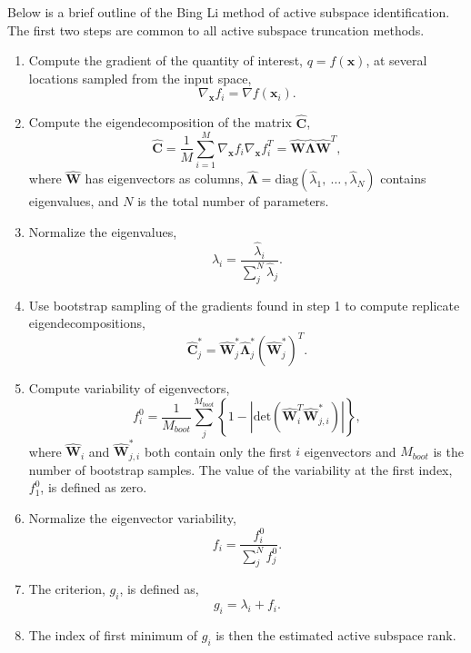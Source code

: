 Below is a brief outline of the Bing Li method of active subspace 
identification. The first two steps are common to all active subspace 
truncation methods.
\begin{enumerate}
\item Compute the gradient of the quantity of interest, $q = f(\mathbf{x})$,
    at several locations sampled from the input space,
    $$\nabla_{\mathbf{x}} f_i = \nabla f(\mathbf{x}_i).$$

\item Compute the eigendecomposition of the matrix $\hat{\mathbf{C}}$,
    $$\hat{\mathbf{C}} = \frac{1}{M}\sum_{i=1}^{M}\nabla_{\mathbf{x}} f_i\nabla_{\mathbf{x}} f_i^T = \hat{\mathbf{W}}\hat{\mathbf{\Lambda}}\hat{\mathbf{W}}^T,$$
    where $\hat{\mathbf{W}}$ has eigenvectors as columns, 
    $\hat{\mathbf{\Lambda}} = \text{diag}(\hat{\lambda}_1,\:\ldots\:,\hat{\lambda}_N)$
    contains eigenvalues, and $N$ is the total number of parameters.

\item Normalize the eigenvalues,
    $$\lambda_i = \frac{\hat{\lambda}_i}{\sum_j^N \hat{\lambda}_j}.$$

\item Use bootstrap sampling of the gradients found in step 1 to compute replicate
    eigendecompositions,
    $$\hat{\mathbf{C}}_j^* = \hat{\mathbf{W}}_j^*\hat{\mathbf{\Lambda}}_j^*\left(\hat{\mathbf{W}}_j^*\right)^T.$$

\item Compute variability of eigenvectors,
    $$f_i^0 = \frac{1}{M_{boot}}\sum_j^{M_{boot}}\left\lbrace 1 - \left\vert\text{det}\left(\hat{\mathbf{W}}_i^T\hat{\mathbf{W}}_{j,i}^*\right)\right\vert\right\rbrace ,$$
    where $\hat{\mathbf{W}}_i$ and $\hat{\mathbf{W}}_{j,i}^*$ both 
    contain only the first $i$ eigenvectors and $M_{boot}$ is the 
    number of bootstrap samples. The value of the variability at the first index,
    $f_1^0$, is defined as zero.

\item Normalize the eigenvector variability,
    $$f_i = \frac{f_i^0}{\sum_j^N f_j^0}.$$

\item The criterion, $g_i$, is defined as,
    $$g_i = \lambda_i + f_i.$$

\item The index of first minimum of $g_i$ is then the estimated active 
    subspace rank.
\end{enumerate}


